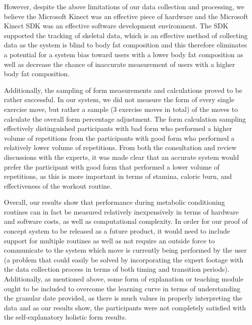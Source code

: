 However, despite the above limitations of our data collection and processing, we believe the Microsoft Kinect was an effective piece of hardware and the Microsoft Kinect SDK was an effective software development environment.  The SDK supported the tracking of skeletal data, which is an effective method of collecting data as the system is blind to body fat composition and this therefore eliminates a potential for a system bias toward users with a lower body fat composition as well as decrease the chance of inaccurate measurement of users with a higher body fat composition.

Additionally, the sampling of form measurements and calculations proved to be rather successful.  In our system, we did not measure the form of every single exercise move, but rather a sample (3 exercise moves in total) of the moves to calculate the overall form percentage adjustment.  The form calculation sampling effectively distinguished participants with bad form who performed a higher volume of repetitions from the participants with good form who performed a relatively lower volume of repetitions.  From both the consultation and review discussions with the experts, it was made clear that an accurate system would prefer the participant with good form that performed a lower volume of repetitions, as this is more important in terms of stamina, caloric burn, and effectiveness of the workout routine.

Overall, our results show that performance during metabolic conditioning routines can in fact be measured relatively inexpensively in terms of hardware and software costs, as well as computational complexity.  In order for our proof of concept system to be released as a future product, it would need to include support for multiple routines as well as not require an outside force to communicate to the system which move is currently being performed by the user (a problem that could easily be solved by incorporating the expert footage with the data collection process in terms of both timing and transition periods).  Additionally, as mentioned above, some form of explanation or teaching module ought to be included to overcome the learning curve in terms of understanding the granular date provided, as there is much values in properly interpreting the data and as our results show, the participants were not completely satisfied with the self-explanatory holistic form results. 